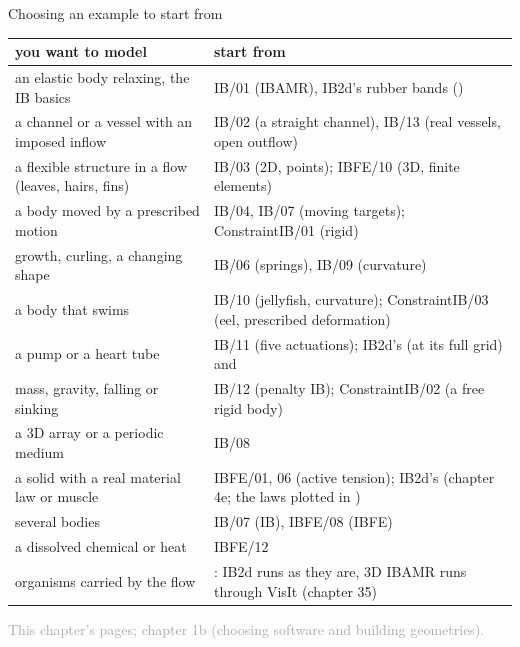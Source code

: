 \documentclass[aspectratio=169,11pt]{beamer}
\newcommand{\sourcecredit}[1]{\vfill\begin{flushright}\tiny\textcolor{DarkGray}{#1}\end{flushright}}
\begin{document}
\begin{frame}{Choosing an example to start from}
\label{fr:choose}
\scriptsize
\renewcommand{\arraystretch}{0.95}
\begin{tabular}{@{}L{0.44\textwidth}L{0.5\textwidth}@{}}
\toprule
you want to model & start from \\
\midrule
an elastic body relaxing, the IB basics & IB/01 (IBAMR), IB2d's rubber bands () \\
a channel or a vessel with an imposed inflow & IB/02 (a straight channel), IB/13 (real vessels, open outflow) \\
a flexible structure in a flow (leaves, hairs, fins) & IB/03 (2D, points); IBFE/10 (3D, finite elements) \\
a body moved by a prescribed motion & IB/04, IB/07 (moving targets); ConstraintIB/01 (rigid) \\
growth, curling, a changing shape & IB/06 (springs), IB/09 (curvature) \\
a body that swims & IB/10 (jellyfish, curvature); ConstraintIB/03 (eel, prescribed deformation) \\
a pump or a heart tube & IB/11 (five actuations); IB2d's  (at its full grid) and  \\
mass, gravity, falling or sinking & IB/12 (penalty IB); ConstraintIB/02 (a free rigid body) \\
a 3D array or a periodic medium & IB/08 \\
a solid with a real material law or muscle & IBFE/01, 06 (active tension); IB2d's  (chapter 4e; the laws plotted in ) \\
several bodies & IB/07 (IB), IBFE/08 (IBFE) \\
a dissolved chemical or heat & IBFE/12 \\
organisms carried by the flow & : IB2d runs as they are, 3D IBAMR runs through VisIt (chapter 35) \\
\bottomrule
\end{tabular}
\sourcecredit{This chapter's pages; chapter 1b (choosing software and building geometries).}
\end{frame}
\end{document}
